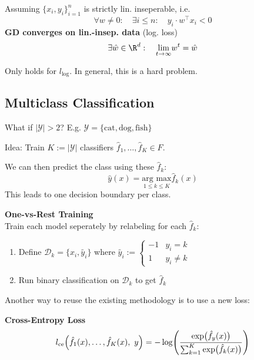 Assuming $\{x_i,y_i\}_{i=1}^n$ is strictly lin. inseperable, i.e.
$$
    \forall w \neq 0:\quad \exists i \leq n: \quad y_i \cdot w^\top x_i < 0
$$
\theorem \textbf{GD converges on lin.-insep. data} (log. loss)
$$
    \exists \hat{w} \in \R^d: \quad \underset{t\to\infty}{\lim}w^t = \hat{w}
$$

\remark Only holds for $l_\text{log}$. In general, this is a hard problem.

\newpage

\subsection{Multiclass Classification}

What if $|\mathcal{Y}| > 2$? E.g. $\mathcal{Y} = \{\text{cat}, \text{dog}, \text{fish} \}$

Idea: Train $K := |\mathcal{Y}|$ classifiers $\hat{f}_1,\ldots,\hat{f}_K \in F$.\\

We can then predict the class using these $\hat{f}_k$:
$$
    \hat{y}(x) = \underset{1\leq k\leq K}{\text{arg max}} \hat{f}_k(x)
$$
This leads to one decision boundary per class.

 \textbf{One-vs-Rest Training}\\
Train each model seperately by relabeling for each $\hat{f}_k$:
\begin{enumerate}
    \item Define $\mathcal{D}_k = \{x_i, \tilde{y_i}\}$ where $\tilde{y_i} := \begin{cases}
        -1  & y_i=k \\
        1   & y_i\neq k
    \end{cases}$
    \item Run binary classification on $\mathcal{D}_k$ to get $\hat{f}_k$
\end{enumerate}

Another way to reuse the existing methodology is to use a new loss:

 \textbf{Cross-Entropy Loss}
$$
    l_\text{ce}\Bigl( \hat{f}_1(x),\ldots,\hat{f}_K(x),\ y \Bigr) = -\log\Biggl( \frac{\exp\bigl(\hat{f}_y(x)\bigr)}{\sum_{k=1}^{K}\exp\bigl( \hat{f}_k(x) \bigr)} \Biggr)
$$

